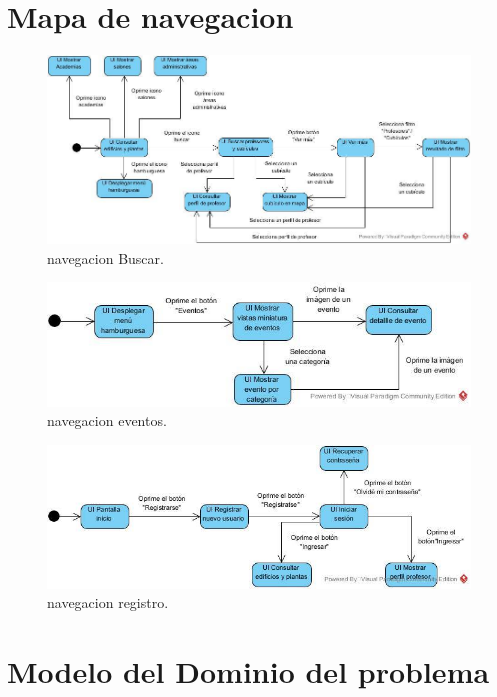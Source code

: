 \documentclass[oneside,10pt]{book}
\begin{document}
\chapter{Mapa de navegacion}

	\begin{figure}[htbp!]
		\centering
			\includegraphics[width=.5\textwidth]{mapa_nave/imagenesnav/buscar1}
		\caption{navegacion Buscar.}
	\end{figure}
	
	\begin{figure}[htbp!]
		\centering
			\includegraphics[width=.5\textwidth]{mapa_nave/imagenesnav/eventos}
		\caption{navegacion eventos.}
	\end{figure}
	
	\begin{figure}[htbp!]
		\centering
			\includegraphics[width=.5\textwidth]{mapa_nave/imagenesnav/registro}
		\caption{navegacion registro.}
	\end{figure}


\chapter{Modelo del Dominio del problema}
\end{document}
